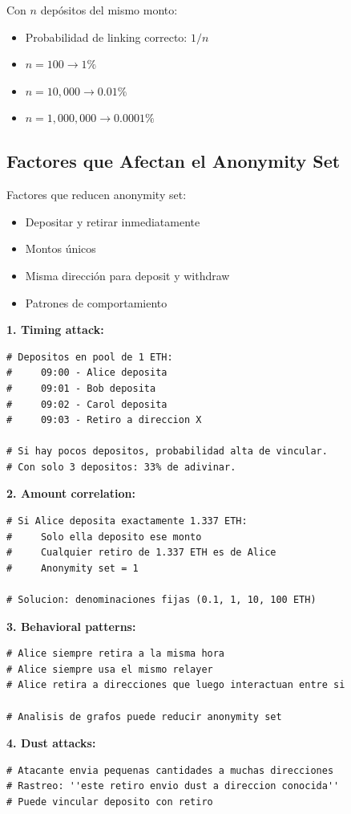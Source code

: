 \documentclass[11pt,a4paper,twoside]{book}
\begin{document}
\begin{mathnote}
Con $n$ dep\'ositos del mismo monto:
\begin{itemize}
    \item Probabilidad de linking correcto: $1/n$
    \item $n = 100 \to 1\%$
    \item $n = 10,000 \to 0.01\%$
    \item $n = 1,000,000 \to 0.0001\%$
\end{itemize}
\end{mathnote}

\subsection{Factores que Afectan el Anonymity Set}

Factores que reducen anonymity set:
\begin{itemize}
    \item Depositar y retirar inmediatamente
    \item Montos \'unicos
    \item Misma direcci\'on para deposit y withdraw
    \item Patrones de comportamiento
\end{itemize}

\begin{example}
\textbf{1. Timing attack:}
\begin{lstlisting}[style=python]
# Depositos en pool de 1 ETH:
#     09:00 - Alice deposita
#     09:01 - Bob deposita
#     09:02 - Carol deposita
#     09:03 - Retiro a direccion X
    
# Si hay pocos depositos, probabilidad alta de vincular.
# Con solo 3 depositos: 33% de adivinar.
\end{lstlisting}

\textbf{2. Amount correlation:}
\begin{lstlisting}[style=python]
# Si Alice deposita exactamente 1.337 ETH:
#     Solo ella deposito ese monto
#     Cualquier retiro de 1.337 ETH es de Alice
#     Anonymity set = 1

# Solucion: denominaciones fijas (0.1, 1, 10, 100 ETH)
\end{lstlisting}

\textbf{3. Behavioral patterns:}
\begin{lstlisting}[style=python]
# Alice siempre retira a la misma hora
# Alice siempre usa el mismo relayer
# Alice retira a direcciones que luego interactuan entre si

# Analisis de grafos puede reducir anonymity set
\end{lstlisting}

\textbf{4. Dust attacks:}
\begin{lstlisting}[style=python]
# Atacante envia pequenas cantidades a muchas direcciones
# Rastreo: ''este retiro envio dust a direccion conocida''
# Puede vincular deposito con retiro
\end{lstlisting}
\end{example}
\end{document}
